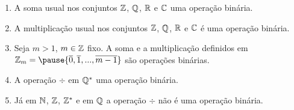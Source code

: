\documentclass{beamer}
\begin{document}
    \begin{frame}
        \begin{exemplos}
            \begin{enumerate}[label={\arabic*})]
                \item A soma usual \pause nos conjuntos $\mathbb{Z}$, \pause $\mathbb{Q}$, \pause $\mathbb{R}$ \pause e $\mathbb{C}$  uma opera{\c c}{\~a}o bin{\'a}ria.\pause

                \vspace{.3cm}

                \item A multiplica\c{c}\~ao usual \pause nos conjuntos $\mathbb{Z}$, \pause $\mathbb{Q}$, \pause $\mathbb{R}$ \pause e $\mathbb{C}$ {\'e} uma opera{\c c}{\~a}o bin{\'a}ria.\pause

                \vspace{.3cm}

                \item Seja $m > 1$, \pause $m \in \mathbb{Z}$ fixo. \pause A soma \pause e a multiplica\c{c}\~ao definidos em $\z_m = \pause \{\overline{0}, \overline{1}, ..., \overline{m-1}\}$ \pause s\~ao opera\c{c}\~oes bin\'arias.\pause
                
                \vspace{.3cm}

                \item A opera\c{c}\~ao $\div$ \pause em $\mathbb{Q}^{*}$  uma opera{\c c}{\~a}o bin{\'a}ria.\pause
                
                \vspace{.3cm}

                \item J\'a em $\mathbb{N}$, \pause $\mathbb{Z}$, \pause $\mathbb{Z}^{*}$ \pause e em $\mathbb{Q}$ \pause a opera\c{c}\~ao $\div$ \pause n{\~a}o {\'e} uma opera{\c c}{\~a}o bin{\'a}ria.\pause
                
                \vspace{.3cm}

            \end{enumerate}
        \end{exemplos}
    \end{frame}
\end{document}
